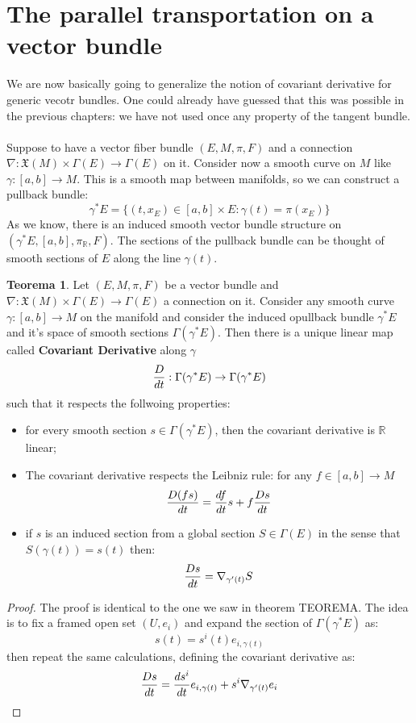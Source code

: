 \documentclass[12pt,a4paper]{report}
\theoremstyle{definition}
\theoremstyle{Theorem}
\newtheorem{Theo}[Def]{Teorema}
\theoremstyle{definition}
\theoremstyle{definition}
\theoremstyle{definition}
\begin{document}
		\section{The parallel transportation on a vector bundle}
			We are now basically going to generalize the notion of covariant derivative for generic vecotr bundles. One could already have guessed that this was possible in the previous chapters: we have not used once any property of the tangent bundle.\\
			\\
			Suppose to have a vector fiber bundle $(E,M,\pi,F)$ and a connection $\nabla:\mathfrak{X}(M)\times \Gamma(E)\rightarrow\Gamma(E)$ on it. Consider now a smooth curve on $M$ like $\gamma:[a,b]\rightarrow M$. This is a smooth map between manifolds, so we can construct a pullback bundle:
			$$\gamma^*E=\{(t,x_E)\in [a,b]\times E:\gamma(t)=\pi(x_E)\}$$
			As we know, there is an induced smooth vector bundle structure on $(\gamma^*E,[a,b],\pi_\mathbb{R},F)$. The sections of the pullback bundle can be thought of smooth sections of $E$ along the line $\gamma(t)$.
			\begin{Theo}
				Let $(E,M,\pi,F)$ be a vector bundle and $\nabla:\mathfrak{X}(M)\times \Gamma(E)\rightarrow\Gamma(E)$ a connection on it. Consider any smooth curve $\gamma:[a,b]\rightarrow M$ on the manifold and consider the induced opullback bundle $\gamma^*E$ and it's space of smooth sections $\Gamma(\gamma^*E)$. Then there is a unique linear map called \textbf{Covariant Derivative} along $\gamma$
				$${D\over dt}:\Gamma(\gamma^*E)\rightarrow \Gamma(\gamma^*E)$$
				such that it respects the follwoing properties:
				\begin{itemize}
					\item for every smooth section $s\in \Gamma(\gamma^*E)$,
					then the covariant derivative is $\mathbb{R}$ linear;
					\item The covariant derivative respects the Leibniz rule: for any $f\in [a,b]\rightarrow M$ 
					$${D(fs)\over dt}={df\over dt}s+f{Ds\over dt}$$
					\item if $s$ is an induced section from a global section $S\in\Gamma(E)$ in the sense that $S(\gamma(t))=s(t)$ then:
					$${Ds\over dt}=\nabla_{\gamma'(t)}S$$  
				\end{itemize} 
			\end{Theo}
			\begin{proof}
				The proof is identical to the one we saw in theorem TEOREMA. The idea is to fix a framed open set $(U,e_i)$ and expand the section of $\Gamma(\gamma^*E)$ as:
				$$s(t)=s^i(t)e_{i,\gamma(t)}$$
				then repeat the same calculations, defining the covariant derivative as:
				$${Ds\over dt}={ds^i\over dt}e_{i,\gamma(t)}+s^i\nabla_{\gamma'(t)}e_{i}$$
			\end{proof}
\end{document}
